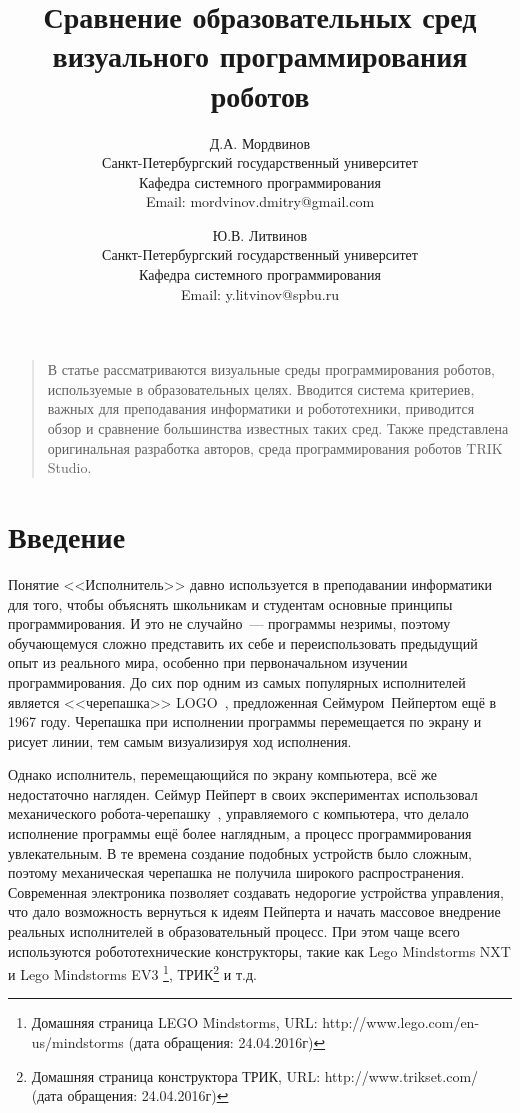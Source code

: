 \documentclass[a5paper]{article}
\title{Сравнение образовательных сред визуального программирования роботов}
\author{
	Д.А. Мордвинов \\
	Санкт-Петербургский государственный университет\\
	Кафедра системного программирования\\
	Email: mordvinov.dmitry@gmail.com
\and
	Ю.В. Литвинов \\
	Санкт-Петербургский государственный университет\\
	Кафедра системного программирования\\
	Email: y.litvinov@spbu.ru
}
\date{}
\begin{document}
\maketitle
\thispagestyle{empty}

\begin{quote}
\small\noindent В статье рассматриваются визуальные среды программирования роботов, используемые в образовательных целях.
Вводится система критериев, важных для преподавания информатики и робототехники, приводится обзор и сравнение большинства
известных таких сред. Также представлена оригинальная разработка авторов, среда программирования роботов TRIK Studio.
\end{quote}

\section*{Введение}
Понятие <<Исполнитель>> давно используется в преподавании информатики для того, чтобы объяснять школьникам и студентам 
основные принципы программирования. И это не случайно~--- программы незримы, поэтому обучающемуся сложно представить 
их себе и переиспользовать предыдущий опыт из реального мира, особенно при первоначальном изучении программирования. 
До сих пор одним из самых популярных исполнителей является <<черепашка>> LOGO~\cite{papert1980mindstorms}, 
предложенная Сеймуром~Пейпертом ещё в 1967 году. Черепашка при исполнении программы перемещается 
по экрану и рисует линии, тем самым визуализируя ход исполнения. 

Однако исполнитель, перемещающийся по экрану компьютера, всё же недостаточно нагляден. Сеймур Пейперт в своих 
экспериментах использовал механического робота-черепашку~\cite{papert1980mindstorms}, управляемого с 
компьютера, что делало исполнение программы ещё более наглядным, а процесс программирования увлекательным. 
В те времена создание подобных устройств было сложным, поэтому механическая черепашка не получила широкого 
распространения. Современная электроника позволяет создавать недорогие устройства управления, что дало 
возможность вернуться к идеям Пейперта и начать массовое внедрение реальных исполнителей в образовательный 
процесс. При этом чаще всего используются робототехнические 
конструкторы, такие как Lego Mindstorms NXT и Lego Mindstorms EV3%
\footnote{Домашняя страница LEGO Mindstorms, URL: http://www.lego.com/en-us/mindstorms (дата обращения: 24.04.2016г)}, 
ТРИК\footnote{Домашняя страница конструктора ТРИК, URL: http://www.trikset.com/ (дата обращения: 24.04.2016г)} и т.д.
\end{document}
